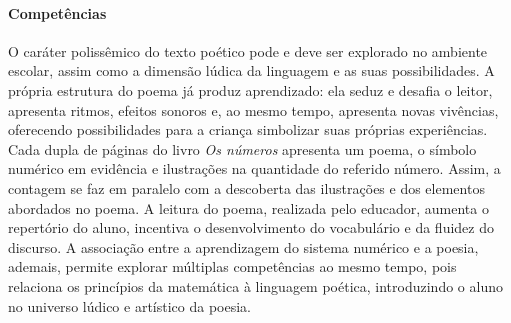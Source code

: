 \documentclass[11pt]{extarticle}
\begin{document}

\paragraph{Competências} 
O caráter polissêmico do texto poético pode e deve ser explorado no ambiente escolar, assim como a dimensão lúdica da linguagem e as suas possibilidades. A própria estrutura do poema já produz aprendizado: ela seduz e desafia o leitor, apresenta ritmos, efeitos sonoros e, ao mesmo tempo, apresenta novas vivências, oferecendo possibilidades para a criança simbolizar suas próprias experiências. Cada dupla de páginas do livro \textit{Os números} apresenta um poema, o símbolo numérico em evidência e ilustrações na quantidade do referido número. Assim, a contagem se faz em paralelo com a descoberta das ilustrações e dos elementos abordados no poema. A leitura do poema, realizada pelo educador, aumenta o repertório do aluno, incentiva o desenvolvimento do vocabulário e da fluidez do discurso.
A associação entre a aprendizagem do sistema numérico e a poesia, ademais, permite explorar múltiplas competências ao mesmo tempo, pois relaciona os princípios da matemática à linguagem poética, introduzindo o aluno no universo lúdico e artístico da poesia.
\end{document}

